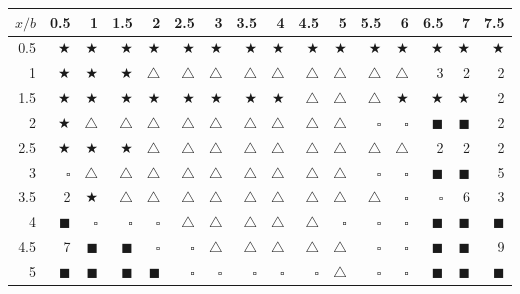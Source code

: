 \documentclass[9pt]{IEEEtran}
\begin{document}
\begin{table*}[htb]

\begin{center}
\begin{tabular}{rrrrrrrrrrrrrrrr}
  \hline
$x/b$ & 0.5 & 1 & 1.5 & 2 & 2.5 & 3 & 3.5 & 4 & 4.5 & 5 & 5.5 & 6 & 6.5 & 7 & 7.5 \\ 
  \hline
0.5 &$\bigstar$  & $\bigstar$  & $\bigstar$  &$\bigstar$  & $\bigstar$  & $\bigstar$  & $\bigstar$  & $\bigstar$  & $\bigstar$  &$\bigstar$  & $\bigstar$  & $\bigstar$  &$\bigstar$  & $\bigstar$  & $\bigstar$  \\ 
  1 & $\bigstar$  &$\bigstar$ & $\bigstar$  & $\triangle$ & $\triangle$ & $\triangle$ & $\triangle$ & $\triangle$ & $\triangle$ & $\triangle$ & $\triangle$ & $\triangle$ & 3 & 2 & 2 \\ 
  1.5 & $\bigstar$  & $\bigstar$  & $\bigstar$  &$\bigstar$ & $\bigstar$  & $\bigstar$ &$\bigstar$ &$\bigstar$  & $\triangle$ & $\triangle$ & $\triangle$ & $\bigstar$  & $\bigstar$  & $\bigstar$  & 2 \\ 
  2 & $\bigstar$ & $\triangle$ &$\triangle$ & $\triangle$ & $\triangle$ & $\triangle$ & $\triangle$ & $\triangle$ & $\triangle$ & $\triangle$ & $\square$ & $\square$ &  $\blacksquare$ & $\blacksquare$ & 2 \\ 
  2.5 &$\bigstar$ & $\bigstar$ & $\bigstar$ & $\triangle$ &$\triangle$ & $\triangle$ & $\triangle$ & $\triangle$ & $\triangle$ & $\triangle$ &$\triangle$ &$\triangle$ & 2 & 2 & 2 \\ 
  3 & $\square$ & $\triangle$ &$\triangle$ & $\triangle$ & $\triangle$ & $\triangle$ & $\triangle$ & $\triangle$ & $\triangle$ & $\triangle$ & $\square$ & $\square$ & $\blacksquare$ & $\blacksquare$ & 5 \\ 
  3.5 & 2 & $\bigstar$ & $\triangle$ &$\triangle$ & $\triangle$ & $\triangle$ & $\triangle$& $\triangle$ & $\triangle$ & $\triangle$ & $\triangle$ & $\square$ & $\square$ & 6 & 3 \\ 
  4 & $\blacksquare$ & $\square$ & $\square$ & $\square$ & $\triangle$ & $\triangle$ & $\triangle$ & $\triangle$ & $\triangle$ & $\square$ & $\square$ & $\square$ & $\blacksquare$& $\blacksquare$ &$\blacksquare$ \\ 
  4.5 &7 & $\blacksquare$ & $\blacksquare$ & $\square$ &$\square$ & $\triangle$ & $\triangle$ & $\triangle$ & $\triangle$ & $\triangle$ & $\square$ & $\square$ & $\blacksquare$ & $\blacksquare$ & 9 \\ 
  5 & $\blacksquare$ & $\blacksquare$ & $\blacksquare$ & $\blacksquare$ & $\square$ &$\square$ & $\square$ & $\square$ & $\square$ &$\triangle$ & $\square$& $\square$ & $\blacksquare$ &$\blacksquare$& $\blacksquare$ \\ 

\end{tabular}
\end{center}
\end{table*}
\end{document}
